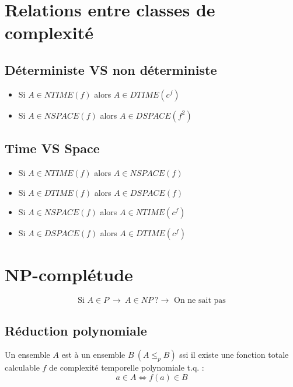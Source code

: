 \section{Relations entre classes de complexité}

\subsection{Déterministe VS non déterministe}

\begin{itemize}
\item Si $A \in NTIME(f)$ alors $A \in DTIME(c^f)$
\item Si $A \in NSPACE(f)$ alors $A \in DSPACE(f^2)$
\end{itemize}

\subsection{Time VS Space}

\begin{itemize}
\item Si $A \in NTIME(f)$ alors $A \in NSPACE(f)$
\item Si $A \in DTIME(f)$ alors $A \in DSPACE(f)$
\item Si $A \in NSPACE(f)$ alors $A \in NTIME(c^f)$
\item Si $A \in DSPACE(f)$ alors $A \in DTIME(c^f)$
\end{itemize}

\section{NP-complétude}

\begin{equation*}
\text{Si } A \in P\ \rightarrow\ A \in NP\ ? \rightarrow \text{ On ne sait pas}
\end{equation*}

\subsection{Réduction polynomiale}

Un ensemble $A$ est  à un ensemble $B \ (A \leq_p B)$ ssi il existe une fonction totale calculable $f$ de complexité temporelle polynomiale t.q. :
\begin{equation*}
a \in A \Leftrightarrow f(a) \in B
\end{equation*}

